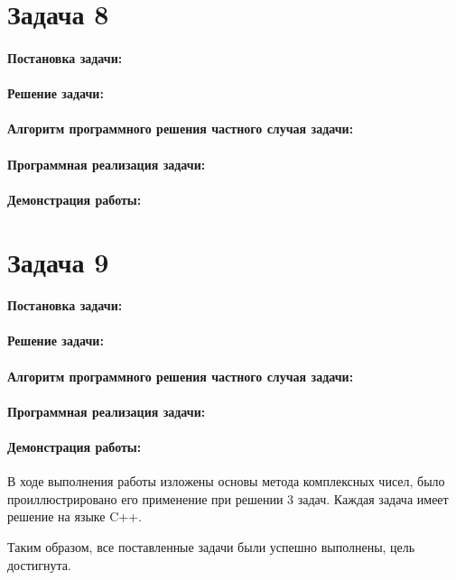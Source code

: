 {
\section*{Задача 8}
\paragraph{Постановка задачи:}
\paragraph{Решение задачи:}
\paragraph{Алгоритм программного решения частного случая задачи:}
\paragraph{Программная реализация задачи:}
\paragraph{Демонстрация работы:}
}{
\section*{Задача 9}
\paragraph{Постановка задачи:}
\paragraph{Решение задачи:}
\paragraph{Алгоритм программного решения частного случая задачи:}
\paragraph{Программная реализация задачи:}
\paragraph{Демонстрация работы:}
}
В ходе выполнения работы изложены основы метода комплексных чисел, было проиллюстрировано его применение при решении 3 задач. Каждая задача имеет решение на языке C++.


Таким образом, все поставленные задачи были успешно выполнены, цель
достигнута.




